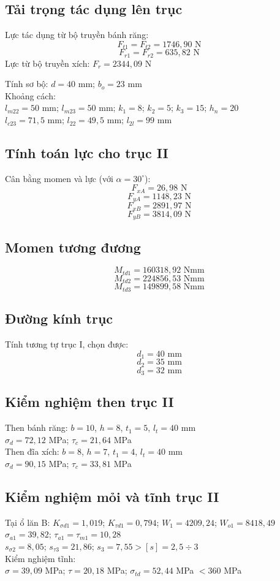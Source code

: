\documentclass[12pt,a4paper]{report}
\begin{document}
\subsection{Tải trọng tác dụng lên trục}
Lực tác dụng từ bộ truyền bánh răng:
$$F_{t1} = F_{t2} = 1746{,}90 \text{ N}$$
$$F_{r1} = F_{r2} = 635{,}82 \text{ N}$$
Lực từ bộ truyền xích: $F_r = 2344{,}09$ N

Tính sơ bộ: $d = 40$ mm; $b_o = 23$ mm\\
Khoảng cách:\\
$l_{m22} = 50$ mm; $l_{m23} = 50$ mm; $k_1=8$; $k_2=5$; $k_3=15$; $h_n=20$\\
$l_{c23} = 71{,}5$ mm; $l_{22} = 49{,}5$ mm; $l_{2l} = 99$ mm

\subsection{Tính toán lực cho trục II}
Cân bằng momen và lực (với $\alpha = 30^\circ$):
$$F_{xA} = 26{,}98 \text{ N}$$
$$F_{yA} = 1148{,}23 \text{ N}$$
$$F_{xB} = 2891{,}97 \text{ N}$$
$$F_{yB} = 3814{,}09 \text{ N}$$

\subsection{Momen tương đương}
$$M_{td1} = 160318{,}92 \text{ Nmm}$$
$$M_{td2} = 224856{,}53 \text{ Nmm}$$
$$M_{td3} = 149899{,}58 \text{ Nmm}$$

\subsection{Đường kính trục}
Tính tương tự trục I, chọn được:
$$d_1=40 \text{ mm}$$
$$d_2=35 \text{ mm}$$
$$d_3=32 \text{ mm}$$

\subsection{Kiểm nghiệm then trục II}
Then bánh răng: $b=10$, $h=8$, $t_1=5$, $l_t=40$ mm\\
$\sigma_d = 72{,}12$ MPa; $\tau_c = 21{,}64$ MPa\\
Then đĩa xích: $b=8$, $h=7$, $t_1=4$, $l_t=40$ mm\\
$\sigma_d = 90{,}15$ MPa; $\tau_c = 33{,}81$ MPa

\subsection{Kiểm nghiệm mỏi và tĩnh trục II}
Tại ổ lăn B:
$K_{\sigma d1} = 1{,}019$; $K_{\tau d1} = 0{,}794$; $W_1 = 4209{,}24$; $W_{o1} = 8418{,}49$\\
$\sigma_{a1} = 39{,}82$; $\tau_{a1} = \tau_{m1} = 10{,}28$\\
$s_{\sigma 2} = 8{,}05$; $s_{\tau 3} = 21{,}86$; $s_3 = 7{,}55 > [s] = 2{,}5 \div 3$\\
Kiểm nghiệm tĩnh:\\
$\sigma = 39{,}09$ MPa; $\tau = 20{,}18$ MPa; $\sigma_{td} = 52{,}44$ MPa $< 360$ MPa
\end{document}
